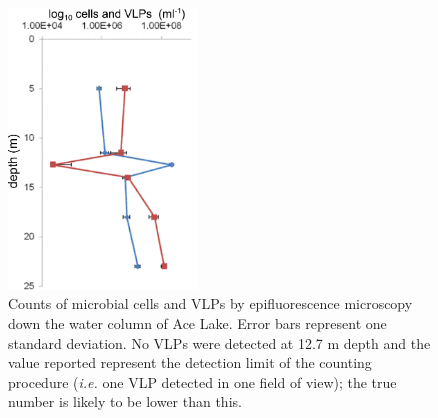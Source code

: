 \begin{figure}
\centering
\includegraphics[width=50mm]{ace_figures/ace_counts.pdf}
\caption[Counts of microbial cells and \acp{VLP} by epifluorescence microscopy]{Counts of microbial cells and \acp{VLP} by epifluorescence microscopy down the water column of Ace Lake.
Error bars represent one standard deviation.
No \acp{VLP} were detected at 12.7 m depth and the value reported represent the detection limit of the counting procedure (\emph{i.e.} one \ac{VLP} detected in one field of view); the true number is likely to be lower than this.
}
\label{fig:ace_counts}

\end{figure}
